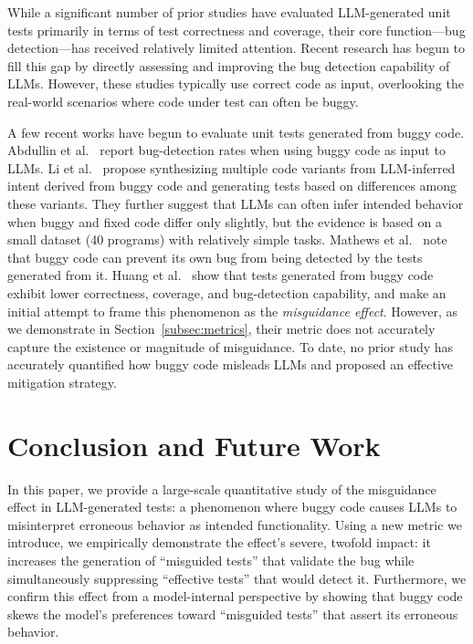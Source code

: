 \documentclass[acmsmall]{acmart}
\begin{document}
While a significant number of prior studies have evaluated LLM-generated unit tests primarily in terms of test correctness and coverage, their core function—bug detection—has received relatively limited attention. Recent research \cite{OnLLMUTGenEvalASE2024, ChatVSSBSTTSE, TestGenLLMandMutIST} has begun to fill this gap by directly assessing and improving the bug detection capability of LLMs. However, these studies typically use correct code as input, overlooking the real-world scenarios where code under test can often be buggy. 

A few recent works have begun to evaluate unit tests generated from buggy code. Abdullin et al.~\cite{abdullin2025testwarscomparativestudy} report bug-detection rates when using buggy code as input to LLMs. Li et al.~\cite{buggy_intention_infer} propose synthesizing multiple code variants from LLM-inferred intent derived from buggy code and generating tests based on differences among these variants. They further suggest that LLMs can often infer intended behavior when buggy and fixed code differ only slightly, but the evidence is based on a small dataset (40 programs) with relatively simple tasks. Mathews et al.~\cite{buggycodeprevent} note that buggy code can prevent its own bug from being detected by the tests generated from it. Huang et al.~\cite{huang2025measuringinfluenceincorrectcode} show that tests generated from buggy code exhibit lower correctness, coverage, and bug-detection capability, and make an initial attempt to frame this phenomenon as the \emph{misguidance effect}. However, as we demonstrate in Section~\ref{subsec:metrics}, their metric does not accurately capture the existence or magnitude of misguidance. To date, no prior study has accurately quantified how buggy code misleads LLMs and proposed an effective mitigation strategy.
\section{Conclusion and Future Work}
In this paper, we provide a large-scale quantitative study of the misguidance effect in LLM-generated tests: a phenomenon where buggy code causes LLMs to misinterpret erroneous behavior as intended functionality. Using a new metric we introduce, we empirically demonstrate the effect's severe, twofold impact: it increases the generation of ``misguided tests'' that validate the bug while simultaneously suppressing ``effective tests'' that would detect it. Furthermore, we confirm this effect from a model-internal perspective by showing that buggy code skews the model's preferences toward ``misguided tests'' that assert its erroneous behavior.
\end{document}
